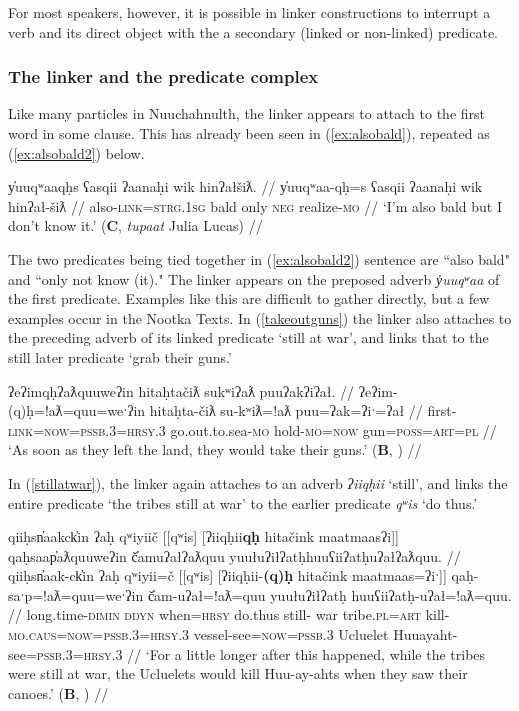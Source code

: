 For most speakers, however, it is possible in linker constructions to interrupt a verb and its direct object with the a secondary (linked or non-linked) predicate.

\subsubsection{The linker and the predicate complex} \label{sec:link:2p}

Like many particles in Nuuchahnulth, the linker appears to attach to the first word in some clause. This has already been seen in (\ref{ex:alsobald}), repeated as (\ref{ex:alsobald2}) below.

\ex \label{ex:alsobald2}
\begingl
\glpreamble y̓uuqʷaaqḥs ʕasqii ʔaanaḥi wik hinʔałšiƛ. //
\gla y̓uuqʷaa-qḥ=s ʕasqii ʔaanaḥi wik hinʔał-šiƛ //
\glb also-\textsc{link}=\textsc{strg.1sg} bald only \textsc{neg} realize-\textsc{mo} //
\glft `I'm also bald but I don't know it.' (\textbf{C}, \textit{tupaat} Julia Lucas) //
\endgl
\xe

The two predicates being tied together in (\ref{ex:alsobald2}) sentence are ``also bald" and ``only not know (it)." The linker appears on the preposed adverb \textit{y̓uuqʷaa} of the first predicate.	 Examples like this are difficult to gather directly, but a few examples occur in the Nootka Texts. In (\ref{takeoutguns}) the linker also attaches to the preceding adverb of its linked predicate `still at war', and links that to the still later predicate `grab their guns.'

\ex \label{takeoutguns}
\begingl
\glpreamble ʔeʔimqḥʔaƛquuweʔin hitaḥtačiƛ sukʷiʔaƛ puuʔakʔiʔał. //
\gla ʔeʔim-(q)ḥ=!aƛ=quu=weˑʔin hitaḥta-čiƛ su-kʷiƛ=!aƛ puu=ʔak=ʔiˑ=ʔał //
\glb first-\textsc{link}=\textsc{now}=\textsc{pssb.3}=\textsc{hrsy.3} go.out.to.sea-\textsc{mo} hold-\textsc{mo}=\textsc{now} gun=\textsc{poss}=\textsc{art}=\textsc{pl} //
\glft `As soon as they left the land, they would take their guns.' (\textbf{B}, \citealt[395]{sapir1955}) //
\endgl
\xe

In (\ref{stillatwar}), the linker again attaches to an adverb \textit{ʔiiqḥii} `still', and links the entire predicate `the tribes still at war' to the earlier predicate \textit{qʷis} `do thus.'

\ex \label{stillatwar}
\begingl
\glpreamble qiiḥsn̓aakck̓in ʔaḥ qʷiyiič [[qʷis] [ʔiiqḥii\textbf{qḥ} hitačink maatmaasʔi]] qaḥsaap̓aƛquuweʔin č̓amuʔałʔaƛquu yuułuʔiłʔatḥ\footnotemark huuʕiiʔatḥuʔałʔaƛquu. //
\gla qiiḥsn̓aak-ck̓in ʔaḥ qʷiyii=č [[qʷis] [ʔiiqḥii-\textbf{(q)ḥ} hitačink maatmaas=ʔiˑ]] qaḥ-saˑp=!aƛ=quu=weˑʔin  č̓am-uʔał=!aƛ=quu yuułuʔiłʔatḥ huuʕiiʔatḥ-uʔał=!aƛ=quu. //
\glb long.time-\textsc{dimin} \textsc{ddyn} when=\textsc{hrsy} do.thus still- war tribe.\textsc{pl}=\textsc{art} kill-\textsc{mo.caus}=\textsc{now}=\textsc{pssb.3}=\textsc{hrsy.3} vessel-see=\textsc{now}=\textsc{pssb.3} Ucluelet Huuayaht-see=\textsc{pssb.3}=\textsc{hrsy.3} //
\glft `For a little longer after this happened, while the tribes were still at war, the Ucluelets would kill Huu-ay-ahts when they saw their canoes.' (\textbf{B}, \citealt[392]{sapir1955}) //
\endgl
\xe

